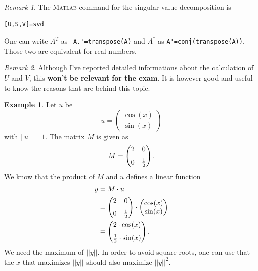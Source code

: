 \documentclass[a4paper,12 pt]{article}
\numberwithin{equation}{section}
\theoremstyle{definition}
\newtheorem{bsp}{Example}
\theoremstyle{remark}
\newtheorem*{bmk}{Remark}
\theoremstyle{definition}
\theoremstyle{definition}
\theoremstyle{definition}
\theoremstyle{remark}
\begin{document}
\begin{bmk}
The \textsc{Matlab} command for the singular value decomposition is
\begin{verbatim}
[U,S,V]=svd
\end{verbatim}
One can write $A^T$ as \verb+ A.'=transpose(A)+ and $A^*$ as \verb+A'=conj(transpose(A))+. Those two are equivalent for real numbers.
\end{bmk}
\begin{bmk}
Although I've reported detailed informations about the calculation of $U$ and $V$, this \textbf{won't be relevant for the exam}. It is however good and useful to know the reasons that are behind this topic.
\end{bmk}

\newpage
\begin{bsp}
Let $u$ be
\begin{equation*}
u=\begin{pmatrix}
\cos(x)\\
\sin(x)
\end{pmatrix}
\end{equation*}
with $||u||=1$. The matrix $M$ is given as
\begin{equation*}
M=\begin{pmatrix}
2&0\\[6pt]
0&{1\over2}\\
\end{pmatrix}.
\end{equation*}
We know that the product of $M$ and $u$ defines a linear function
\begin{equation*}
\begin{split}
y&=M\cdot u\\
&=\begin{pmatrix}
2&0\\[6pt]
0&{1\over2}\\
\end{pmatrix}\cdot \begin{pmatrix}
\cos(x)\\
\sin(x)
\end{pmatrix}\\
&=\begin{pmatrix}
2\cdot \cos(x)\\[6pt]
\frac{1}{2} \cdot \sin(x) 
\end{pmatrix}.
\end{split}
\end{equation*}
We need the maximum of $||y||$. In order to avoid square roots, one can use that the $x$ that maximizes $||y||$ should also maximize $||y||^2$.

\end{bsp}
\end{document}
